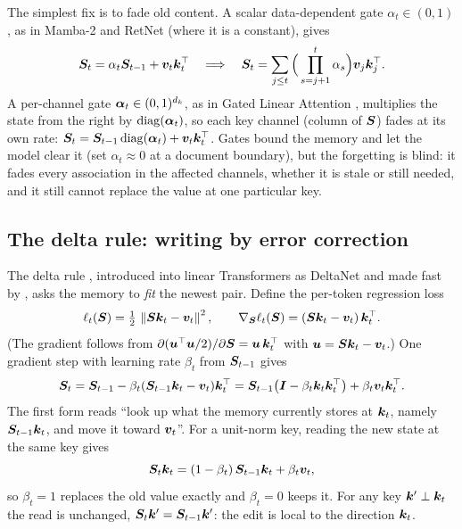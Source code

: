 The simplest fix is to fade old content. A scalar data-dependent gate $\alpha_t \in (0,1)$, as in
Mamba-2 \citep{dao2024ssd} and RetNet \citep{sun2023retnet} (where it is a constant), gives
\begin{equation}\label{eq:c05-scalar-gate}
  \bm{S}_t = \alpha_t \bm{S}_{t-1} + \bm{v}_t\bm{k}_t^{\top}
  \quad\Longrightarrow\quad
  \bm{S}_t = \sum_{j\le t} \Big(\prod_{s=j+1}^{t}\alpha_s\Big)\bm{v}_j\bm{k}_j^{\top} .
\end{equation}
A per-channel gate $\bm{\alpha}_t \in (0,1)^{d_k}$, as in Gated Linear Attention
\citep{yang2024gla}, multiplies the state from the right by $\operatorname{diag}(\bm{\alpha}_t)$, so each key
channel (column of $\bm{S}$) fades at its own rate:
$\bm{S}_t = \bm{S}_{t-1}\operatorname{diag}(\bm{\alpha}_t) + \bm{v}_t\bm{k}_t^{\top}$. Gates bound the memory and let the model
clear it (set $\alpha_t \approx 0$ at a document boundary), but the forgetting is blind: it fades
every association in the affected channels, whether it is stale or still needed, and it still
cannot replace the value at one particular key.

\subsection{The delta rule: writing by error correction}\label{sec:c05-bg-delta}

The delta rule \citep{c02-widrow1960adaptive}, introduced into linear Transformers as DeltaNet
\citep{c02-schlag2021linear} and made fast by \citet{c02-yang2024deltanet}, asks the memory to
\emph{fit} the newest pair. Define the per-token regression loss
\begin{equation}\label{eq:c05-delta-loss}
  \ell_t(\bm{S}) = \tfrac12\,\left\lVert \bm{S}\bm{k}_t - \bm{v}_t\right\rVert^2,
  \qquad
  \nabla_{\bm{S}}\ell_t(\bm{S}) = (\bm{S}\bm{k}_t - \bm{v}_t)\,\bm{k}_t^{\top} .
\end{equation}
(The gradient follows from $\partial(\bm{u}^{\top}\bm{u}/2)/\partial\bm{S} = \bm{u}\,\bm{k}_t^{\top}$ with
$\bm{u} = \bm{S}\bm{k}_t - \bm{v}_t$.) One gradient step with learning rate $\beta_t$ from $\bm{S}_{t-1}$ gives
\begin{equation}\label{eq:c05-delta}
  \bm{S}_t = \bm{S}_{t-1} - \beta_t(\bm{S}_{t-1}\bm{k}_t - \bm{v}_t)\bm{k}_t^{\top}
        = \bm{S}_{t-1}\big(\bm{I} - \beta_t\bm{k}_t\bm{k}_t^{\top}\big) + \beta_t\bm{v}_t\bm{k}_t^{\top} .
\end{equation}
The first form reads ``look up what the memory currently stores at $\bm{k}_t$, namely
$\bm{S}_{t-1}\bm{k}_t$, and move it toward $\bm{v}_t$''. For a unit-norm key, reading the new state at the
same key gives
\begin{equation}\label{eq:c05-delta-read}
  \bm{S}_t\bm{k}_t = (1-\beta_t)\,\bm{S}_{t-1}\bm{k}_t + \beta_t\bm{v}_t ,
\end{equation}
so $\beta_t = 1$ replaces the old value exactly and $\beta_t = 0$ keeps it. For any key
$\bm{k}' \perp \bm{k}_t$ the read is unchanged, $\bm{S}_t\bm{k}' = \bm{S}_{t-1}\bm{k}'$: the edit is local to the
direction $\bm{k}_t$.

